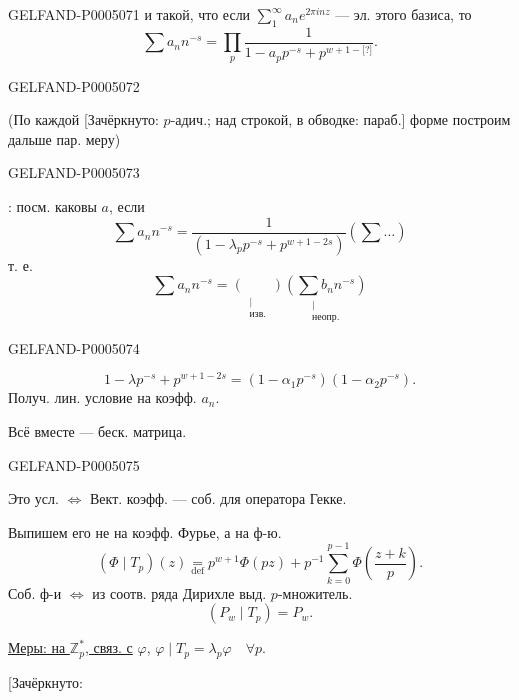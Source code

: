 \begin{GelfandAdjacentEvidence}{GELFAND-P000507}{1}
и такой, что если $\displaystyle\sum_1^\infty a_ne^{2\pi inz}$ — эл. этого базиса, то
\[
\sum a_nn^{-s}=\prod_p\frac{1}{1-a_pp^{-s}+p^{w+1-\text{[?]}}}.
\]
\end{GelfandAdjacentEvidence}
\begin{GelfandAdjacentEvidence}{GELFAND-P000507}{2}


(По каждой [Зачёркнуто: $p$-адич.; над строкой, в обводке: параб.]
форме построим дальше пар. меру)
\end{GelfandAdjacentEvidence}
\begin{GelfandAdjacentEvidence}{GELFAND-P000507}{3}


: посм. каковы $a$, если
\[
\sum a_nn^{-s}=
\frac{1}{\left(1-\lambda_pp^{-s}+p^{w+1-2s}\right)}
\left(\sum\ldots\right)
\]
т. е.
\[
\sum a_nn^{-s}=
\underset{\substack{\vert\\\text{изв.}}}{\left(\qquad\right)}
\underset{\substack{\vert\\\text{неопр.}}}
  {\left(\sum b_nn^{-s}\right)}
\]
\end{GelfandAdjacentEvidence}
\begin{GelfandAdjacentEvidence}{GELFAND-P000507}{4}

\[
1-\lambda p^{-s}+p^{w+1-2s}=(1-\alpha_1p^{-s})(1-\alpha_2p^{-s}).
\]
Получ. лин. условие на коэфф. $a_n$.

Всё вместе — беск. матрица.
\end{GelfandAdjacentEvidence}
\begin{GelfandAdjacentEvidence}{GELFAND-P000507}{5}


Это усл. $\Longleftrightarrow$ Вект. коэфф. — соб. для оператора Гекке.

Выпишем его не на коэфф. Фурье, а на ф-ю.
\[
(\Phi\mid T_p)(z)\underset{\mathrm{def}}{=}
p^{w+1}\Phi(pz)+p^{-1}\sum_{k=0}^{p-1}\Phi\left(\frac{z+k}{p}\right).
\]
Соб. ф-и $\Longleftrightarrow$ из соотв. ряда Дирихле выд. $p$-множитель.
\[
(P_w\mid T_p)=P_w.
\]

\uline{Меры: на \mbox{$\mathbb Z_p^*$}, связ. с}
$\varphi$, $\varphi\mid T_p=\lambda_p\varphi\quad\forall p$.

[Зачёркнуто: 
\end{GelfandAdjacentEvidence}
